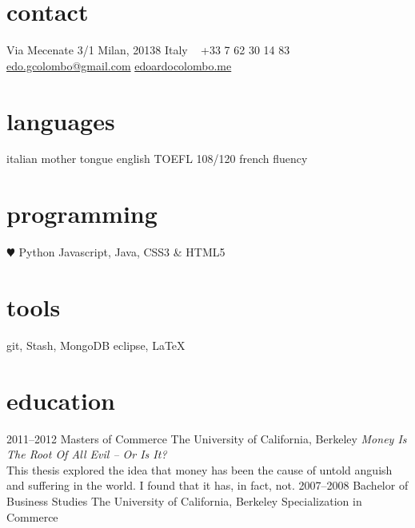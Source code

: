 \documentclass[]{friggeri-cv} %
\begin{document}


\begin{aside} %
\section{contact}
Via Mecenate 3/1
Milan, 20138
Italy
~
+33 7 62 30 14 83
~
\href{mailto:edo.gcolombo@gmail.com}{edo.gcolombo@gmail.com}
\href{http://edoardocolombo.me}{edoardocolombo.me}
\section{languages}
italian mother tongue
english TOEFL 108/120
french fluency
\section{programming}
{\color{red} $\varheartsuit$} Python
Javascript, Java,
CSS3 \& HTML5
\section{tools}
git, Stash, MongoDB
eclipse, \LaTeX
\end{aside}


\section{education}

\begin{entrylist}
\entry
{2011--2012}
{Masters {\normalfont of Commerce}}
{The University of California, Berkeley}
{\emph{Money Is The Root Of All Evil -- Or Is It?} \\ This thesis explored the idea that money has been the cause of untold anguish and suffering in the world. I found that it has, in fact, not.}
\entry
{2007--2008}
{Bachelor {\normalfont of Business Studies}}
{The University of California, Berkeley}
{Specialization in Commerce}
\end{entrylist}
\end{document}

